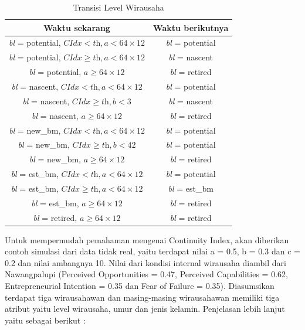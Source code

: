 \begin{table}[H]
\centering
\caption{Transisi Level Wirausaha}
\begin{tabular}{|c|c|}
\hline
Waktu sekarang & Waktu berikutnya \\
\hline
\textit{bl} = potential, $ \textit{CIdx} < \textit{th}, \textit{a} < 64 \times 12$ & \textit{bl} = potential \\
\hline
\textit{bl} = potential, $\textit{CIdx} \geq \textit{th}, \textit{a} < 64 \times 12$ & \textit{bl} = nascent \\
\hline
\textit{bl} = potential, $\textit{a} \geq 64 \times 12$ & \textit{bl} = retired \\
\hline
\textit{bl} = nascent, $\textit{CIdx} < \textit{th}, \textit{a} <64 \times 12$ & \textit{bl} = potential \\
\hline
\textit{bl} = nascent, $\textit{CIdx} \geq \textit{th}, \textit{b} < 3$ & \textit{bl} = nascent \\
\hline
\textit{bl} = nascent, $\textit{a} \geq 64 \times 12$ & \textit{bl} = retired \\
\hline
\textit{bl} = new\_bm, $\textit{CIdx} < \textit{th}, \textit{a} < 64 \times 12$ & \textit{bl} = potential \\
\hline
\textit{bl} = new\_bm, $\textit{CIdx} \geq \textit{th}, \textit{b} < 42$ & \textit{bl} = potential \\
\hline
\textit{bl} = new\_bm, $\textit{a} \geq 64 \times 12$ & \textit{bl} = retired \\
\hline
\textit{bl} = est\_bm, $\textit{CIdx} < \textit{th}, \textit{a} < 64 \times 12$ & \textit{bl} = potential \\
\hline
\textit{bl} = est\_bm, $\textit{CIdx} \geq \textit{th}, \textit{a} < 64 \times 12$ & \textit{bl} = est\_bm \\
\hline
\textit{bl} = est\_bm, $\textit{a} \geq 64 \times 12$ & \textit{bl} = retired \\
\hline
\textit{bl} = retired, $\textit{a} \geq 64 \times 12$ & \textit{bl} = retired \\
\hline
\end{tabular}
\label{tabelLW}
\end{table}


Untuk mempermudah pemahaman mengenai Continuity Index, akan diberikan contoh simulasi dari data tidak real, yaitu terdapat nilai a = 0.5, b = 0.3 dan c = 0.2 dan nilai ambangnya 10. Nilai dari kondisi internal wirausaha diambil dari Nawangpalupi (Perceived Opportunities = 0.47, Perceived Capabilities = 0.62, Entrepreneurial Intention = 0.35 dan Fear of Failure = 0.35). Diasumsikan terdapat tiga wirausahawan dan masing-masing wirausahawan memiliki tiga atribut yaitu level wirausaha, umur dan jenis kelamin. Penjelasan lebih lanjut yaitu sebagai berikut :
				

